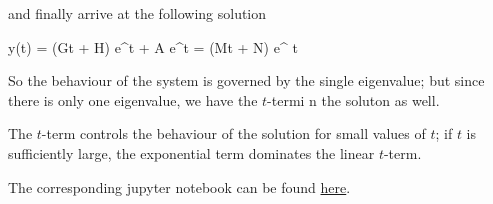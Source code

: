 and finally arrive at the following solution

\bee
y(t) = (Gt + H) e^{\lambda t} + A e^{\lambda t} = (Mt + N) e^{ \lambda t}
\eee

So the behaviour of the system is governed by the single eigenvalue; but since there is only one eigenvalue, we have the $t$-termi n the soluton as well.

The $t$-term controls the behaviour of the solution for small values of $t$; if $t$ is sufficiently large, the exponential term dominates the linear $t$-term.

The corresponding jupyter notebook can be found \href{https://github.com/ClemensFMN/Notebooks/blob/main/ODE/Ex_5.2.11.ipynb}{here}.


